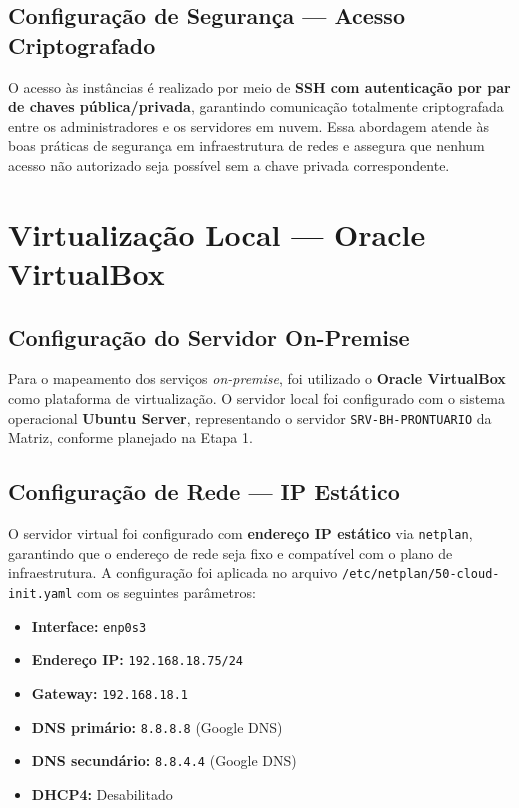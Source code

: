 \documentclass[12pt,a4paper,oneside]{report}
\begin{document}
\subsection{Configuração de Segurança --- Acesso Criptografado}
O acesso às instâncias é realizado por meio de \textbf{SSH com autenticação por par de chaves pública/privada}, garantindo comunicação totalmente criptografada entre os administradores e os servidores em nuvem. Essa abordagem atende às boas práticas de segurança em infraestrutura de redes e assegura que nenhum acesso não autorizado seja possível sem a chave privada correspondente.

\section{Virtualização Local --- Oracle VirtualBox}

\subsection{Configuração do Servidor On-Premise}
Para o mapeamento dos serviços \textit{on-premise}, foi utilizado o \textbf{Oracle VirtualBox} como plataforma de virtualização. O servidor local foi configurado com o sistema operacional \textbf{Ubuntu Server}, representando o servidor \texttt{SRV-BH-PRONTUARIO} da Matriz, conforme planejado na Etapa 1.

\subsection{Configuração de Rede --- IP Estático}
O servidor virtual foi configurado com \textbf{endereço IP estático} via \texttt{netplan}, garantindo que o endereço de rede seja fixo e compatível com o plano de infraestrutura. A configuração foi aplicada no arquivo \texttt{/etc/netplan/50-cloud-init.yaml} com os seguintes parâmetros:

\begin{itemize}[label=\color{pucblue}$\bullet$]
    \item \textbf{Interface:} \texttt{enp0s3}
    \item \textbf{Endereço IP:} \texttt{192.168.18.75/24}
    \item \textbf{Gateway:} \texttt{192.168.18.1}
    \item \textbf{DNS primário:} \texttt{8.8.8.8} (Google DNS)
    \item \textbf{DNS secundário:} \texttt{8.8.4.4} (Google DNS)
    \item \textbf{DHCP4:} Desabilitado
\end{itemize}
\end{document}
